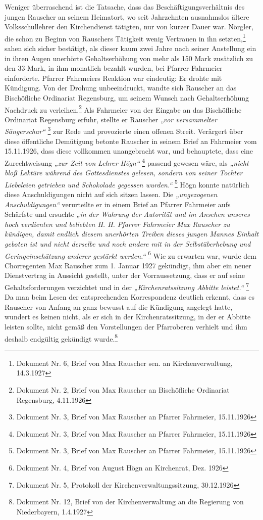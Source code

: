 \documentclass[a4paper]{article}
\newcommand\textstyleZitate[1]{\textit{#1}}
\newcounter{Abb}
\begin{document}
Weniger überraschend ist die Tatsache, dass das Beschäftigungsverhältnis
des jungen Rauscher an seinem Heimatort, wo seit Jahrzehnten
ausnahmslos ältere Volksschullehrer den Kirchendienst tätigten, nur von
kurzer Dauer war. Nörgler, die schon zu Beginn von Rauschers Tätigkeit
wenig Vertrauen in ihn setzten,\footnote{ Dokument Nr. 6, Brief von Max
Rauscher sen. an Kirchenverwaltung, 14.3.1927} sahen sich sicher
bestätigt, als dieser kaum zwei Jahre nach seiner Anstellung ein in
ihren Augen unerhörte Gehaltserhöhung von mehr als 150 Mark zusätzlich
zu den 33 Mark, in ihm monatlich bezahlt wurden, bei Pfarrer Fahrmeier
einforderte. Pfarrer Fahrmeiers Reaktion war eindeutig: Er drohte mit
Kündigung. Von der Drohung unbeeindruckt, wandte sich Rauscher an das
Bischöfliche Ordinariat Regensburg, um seinem Wunsch nach
Gehaltserhöhung Nachdruck zu verleihen.\footnote{ Dokument Nr. 2, Brief
von Max Rauscher an Bischöfliche Ordinariat Regensburg, 4.11.1926} Als
Fahrmeier von der Eingabe an das Bischöfliche Ordinariat Regensburg
erfuhr, stellte er Rauscher \textstyleZitate{„vor versammelter
Sängerschar“} \footnote{ Dokument Nr. 3, Brief von Max Rauscher an
Pfarrer Fahrmeier, 15.11.1926} zur Rede und provozierte einen offenen
Streit. Verärgert über diese öffentliche Demütigung betonte Rauscher in
seinem Brief an Fahrmeier vom 15.11.1926, dass diese vollkommen
unangebracht war, und behauptete, dass eine Zurechtweisung
\textstyleZitate{„zur Zeit von Lehrer Högn“ }\footnote{ Dokument Nr. 3,
Brief von Max Rauscher an Pfarrer Fahrmeier,
15.11.1926}\textstyleZitate{ }passend gewesen wäre, als
\textstyleZitate{„nicht bloß Lektüre während des Gottesdienstes
gelesen, sondern von seiner Tochter Liebeleien getrieben und Schokolade
gegessen wurden.“ }\footnote{ Dokument Nr. 3, Brief von Max Rauscher an
Pfarrer Fahrmeier, 15.11.1926} Högn konnte natürlich diese
Anschuldigungen nicht auf sich sitzen lassen. Die
\textstyleZitate{„ungezogenen Anschuldigungen“} verurteilte er in einem
Brief an Pfarrer Fahrmeier aufs Schärfste und ersuchte
\textstyleZitate{„in der Wahrung der Autorität und im Ansehen unseres
hoch verdienten und beliebten H. H. Pfarrer Fahrmeier Max Rauscher zu
kündigen, damit endlich diesem unerhörten Treiben dieses jungen Mannes
Einhalt geboten ist und nicht derselbe und noch andere mit in der
Selbstüberhebung und Geringeinschätzung anderer gestärkt werden.“
}\footnote{ Dokument Nr. 4, Brief von August Högn an Kirchenrat, Dez.
1926} Wie zu erwarten war, wurde dem Chorregenten Max Rauscher zum 1.
Januar 1927 gekündigt, ihm aber ein neuer Dienstvertrag in Aussicht
gestellt, unter der Vorraussetzung, dass er auf seine
Gehaltsforderungen verzichtet und in der
\textstyleZitate{„Kirchenratssitzung Abbitte leistet.“ }\footnote{
Dokument Nr. 5, Protokoll der Kirchenverwaltungssitzung, 30.12.1926} Da
man beim Lesen der entsprechenden Korrespondenz deutlich erkennt, dass
es Rauscher von Anfang an ganz bewusst auf die Kündigung angelegt
hatte, wundert es keinen nicht, als er sich in der Kirchenratssitzung,
in der er Abbitte leisten sollte, nicht gemäß den Vorstellungen der
Pfarroberen verhielt und ihm deshalb endgültig gekündigt
wurde.\footnote{ Dokument Nr. 12, Brief von der Kirchenverwaltung an
die Regierung von Niederbayern, 1.4.1927}
\end{document}
